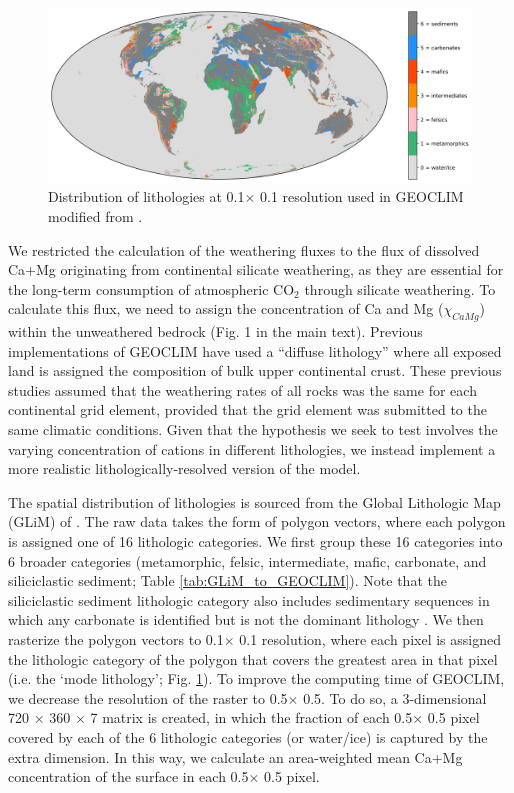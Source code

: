 \documentclass[11pt,letterpaper]{article}
\newcommand{\degrees}{\textdegree\xspace}
\newcommand{\COtwo}{CO$_{2}$\xspace}
\begin{document}
\begin{figure}[h!]
    \centering
    \includegraphics[width=1\textwidth]{Figures/world_lithology.jpg}
    \caption{Distribution of lithologies at 0.1\degrees $\times$ 0.1\degrees resolution used in GEOCLIM modified from \citet{Hartmann2012a}.}
    \label{fig:world_lithology}
\end{figure}

We restricted the calculation of the weathering fluxes to the flux of dissolved Ca+Mg originating from continental silicate weathering, as they are essential for the long-term consumption of atmospheric \COtwo through silicate weathering. To calculate this flux, we need to assign the concentration of Ca and Mg ($\chi_{CaMg}$) within the unweathered bedrock (Fig. 1 in the main text). Previous implementations of GEOCLIM have used a ``diffuse lithology'' where all exposed land is assigned the composition of bulk upper continental crust. These previous studies assumed that the weathering rates of all rocks was the same for each continental grid element, provided that the grid element was submitted to the same climatic conditions. Given that the hypothesis we seek to test involves the varying concentration of cations in different lithologies, we instead implement a more realistic lithologically-resolved version of the model.

The spatial distribution of lithologies is sourced from the Global Lithologic Map (GLiM) of \citet{Hartmann2012a}. The raw data takes the form of polygon vectors, where each polygon is assigned one of 16 lithologic categories. We first group these 16 categories into 6 broader categories (metamorphic, felsic, intermediate, mafic, carbonate, and siliciclastic sediment; Table \ref{tab:GLiM_to_GEOCLIM}). Note that the siliciclastic sediment lithologic category also includes sedimentary sequences in which any carbonate is identified but is not the dominant lithology \cite{Hartmann2012a}. We then rasterize the polygon vectors to 0.1\degrees $\times$ 0.1\degrees resolution, where each pixel is assigned the lithologic category of the polygon that covers the greatest area in that pixel (i.e. the `mode lithology'; Fig. \ref{fig:world_lithology}). To improve the computing time of GEOCLIM, we decrease the resolution of the raster to 0.5\degrees $\times$ 0.5\degrees. To do so, a 3-dimensional 720 $\times$ 360 $\times$ 7 matrix is created, in which the fraction of each 0.5\degrees $\times$ 0.5\degrees pixel covered by each of the 6 lithologic categories (or water/ice) is captured by the extra dimension. In this way, we calculate an area-weighted mean Ca+Mg concentration of the surface in each 0.5\degrees $\times$ 0.5\degrees pixel.
\end{document}
